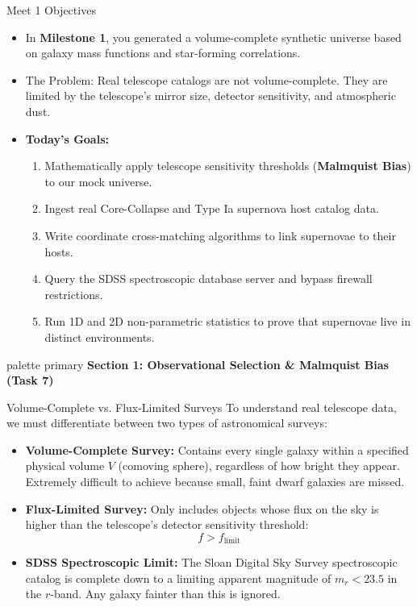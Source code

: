 \documentclass[9pt]{beamer}
\begin{document}
\begin{frame}{Meet 1 Objectives}
  \begin{itemize}
    \item In \textbf{Milestone 1}, you generated a volume-complete synthetic universe based on galaxy mass functions and star-forming correlations.
    \item \alert{The Problem:} Real telescope catalogs are not volume-complete. They are limited by the telescope's mirror size, detector sensitivity, and atmospheric dust.
    \item \textbf{Today's Goals:}
      \begin{enumerate}
        \item Mathematically apply telescope sensitivity thresholds (\textbf{Malmquist Bias}) to our mock universe.
        \item Ingest real Core-Collapse and Type Ia supernova host catalog data.
        \item Write coordinate cross-matching algorithms to link supernovae to their hosts.
        \item Query the SDSS spectroscopic database server and bypass firewall restrictions.
        \item Run 1D and 2D non-parametric statistics to prove that supernovae live in distinct environments.
      \end{enumerate}
  \end{itemize}
\end{frame}

\begin{frame}[plain]
  \vfill
  \centering
  \begin{beamercolorbox}[sep=8pt,center,shadow=true,rounded=true]{palette primary}
    \textbf{Section 1: Observational Selection \& Malmquist Bias (Task 7)}
  \end{beamercolorbox}
  \vfill
\end{frame}

\begin{frame}{Volume-Complete vs. Flux-Limited Surveys}
  To understand real telescope data, we must differentiate between two types of astronomical surveys:
  \begin{itemize}
    \item \textbf{Volume-Complete Survey:}
      Contains every single galaxy within a specified physical volume $V$ (comoving sphere), regardless of how bright they appear. Extremely difficult to achieve because small, faint dwarf galaxies are missed.
    \item \textbf{Flux-Limited Survey:}
      Only includes objects whose flux on the sky is higher than the telescope's detector sensitivity threshold:
      $$f > f_{\text{limit}}$$
    \item \textbf{SDSS Spectroscopic Limit:}
      The Sloan Digital Sky Survey spectroscopic catalog is complete down to a limiting apparent magnitude of $m_r < 23.5$ in the $r$-band. Any galaxy fainter than this is ignored.
  \end{itemize}
\end{frame}
\end{document}
